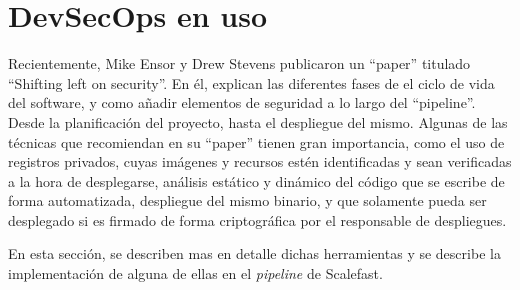 \documentclass[12pt]{report} %
\begin{document}
\section{DevSecOps en uso}

Recientemente, Mike Ensor y Drew Stevens publicaron un ``paper'' titulado ``Shifting left on security''.
En él, explican las diferentes fases de el ciclo de vida del software, y como añadir elementos de seguridad a lo largo del ``pipeline''. 
Desde la planificación del proyecto, hasta el despliegue del mismo.
Algunas de las técnicas que recomiendan en su ``paper'' tienen gran importancia, como el uso de registros privados, cuyas imágenes y recursos estén identificadas y sean verificadas a la hora de desplegarse, análisis estático y dinámico del código que se escribe de forma automatizada, despliegue del mismo binario, y que solamente pueda ser desplegado si es firmado de forma criptográfica por el responsable de despliegues.\cite{Ensor2021}

En esta sección, se describen mas en detalle dichas herramientas y se describe la implementación de alguna de ellas en el \textit{\gls{pipeline}} de Scalefast.

\clearpage

\printglossary[type=\acronymtype]

\printglossary




\end{document}
